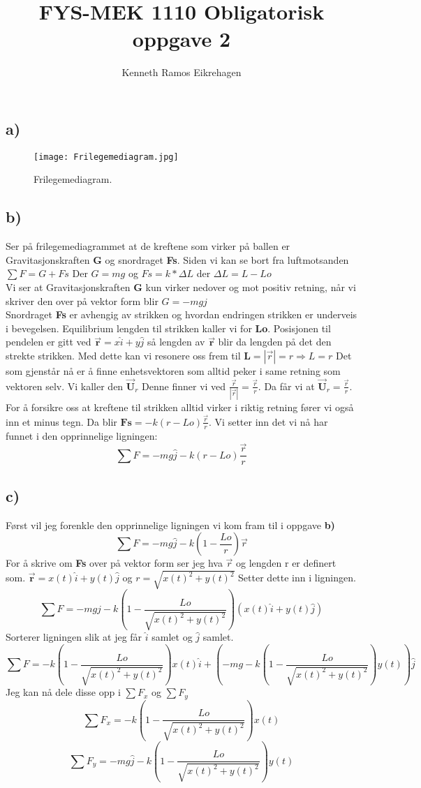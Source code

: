 \documentclass[a4paper,12pt,norsk]{article}
\title{FYS-MEK 1110 Obligatorisk oppgave 2}
\author{Kenneth Ramos Eikrehagen}
\begin{document}
\maketitle
\tableofcontents
\subsection*{a)}
\begin{figure}[h!]
\texttt{[image: Frilegemediagram.jpg]} 
\caption{Frilegemediagram.}
\end{figure}
\subsection*{b)}
Ser på frilegemediagrammet at de kreftene som virker på ballen er Gravitasjonskraften \textbf{G} og snordraget \textbf{Fs}. Siden vi kan se bort fra luftmotsanden
$ \sum F = G + Fs$ Der $G = mg$ og $Fs = k*\Delta{L}$ der $\Delta{L} = L - Lo$ \\
Vi ser at Gravitasjonskraften \textbf{G} kun virker nedover og mot positiv retning, når vi skriver den over på vektor form blir $G = -mg\hat{j}$\\
Snordraget \textbf{Fs} er avhengig av strikken og hvordan endringen strikken er underveis i bevegelsen. Equilibrium lengden til strikken kaller vi for \textbf{Lo}. Posisjonen til pendelen er gitt ved $\vec{\textbf{r}} = x\hat{i} + y\hat{j}$ så lengden av $\vec{\textbf{r}}$ blir da lengden på det den strekte strikken. Med dette kan vi resonere oss frem til $\textbf{L} = |\vec{r}| = r \Rightarrow L = r$ Det som gjenstår nå er å finne enhetsvektoren som alltid peker i same retning som vektoren selv. Vi kaller den $\vec{\textbf{U}}_r$ Denne finner vi ved $\frac{\vec{r}}{|\vec{r}|}= \frac{\vec{r}}{r}$. Da får vi at  $\vec{\textbf{U}}_r = \frac{\vec{r}}{r}$. For å forsikre oss at kreftene til strikken alltid virker i riktig retning fører vi også inn et minus tegn. Da blir $\textbf{Fs}  = - k(r - Lo)\frac{\vec{r}}{r}$. Vi setter inn det vi nå har funnet i den opprinnelige ligningen: $$\sum{F} = -mg\hat{j} - k(r - Lo)\frac{\vec{r}}{r}$$

\subsection*{c)}
Først vil jeg forenkle den opprinnelige ligningen vi kom fram til i oppgave \textbf{b)} 
$$\sum{F} = -mg\hat{j} - k(1 - \frac{Lo}{r})\vec{r}$$ 
For å skrive om \textbf{Fs} over på vektor form ser jeg hva $\vec{r}$ og lengden r er definert som. $\vec{\textbf{r}} = x(t)\hat{i} + y(t)\hat{j}$ og $ r = \sqrt{x(t)^2 + y(t)^2}$ Setter dette inn i ligningen.
$$\sum{F} = -mg\hat{j} - k(1 - \frac{Lo}{\sqrt{x(t)^2 + y(t)^2}})(x(t)\hat{i} + y(t)\hat{j})$$ 
Sorterer ligningen slik at jeg får $\hat{i}$ samlet og $\hat{j}$ samlet.
$$\sum{F} = - k(1 - \frac{Lo}{\sqrt{x(t)^2 + y(t)^2}})x(t)\hat{i} + (-mg- k(1 - \frac{Lo}{\sqrt{x(t)^2 + y(t)^2}})y(t))\hat{j}$$
Jeg kan nå dele disse opp i $\sum{F_x}$ og $\sum{F_y}$
$$\sum{F_x} = - k(1 - \frac{Lo}{\sqrt{x(t)^2 + y(t)^2}})x(t)$$ 
$$\sum{F_y} = -mg\hat{j} - k(1 - \frac{Lo}{\sqrt{x(t)^2 + y(t)^2}})y(t)$$
\end{document}
